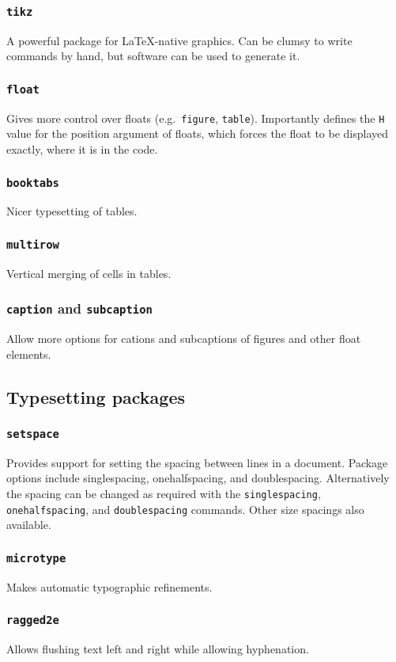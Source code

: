 \documentclass{article}
\begin{document}
\subsubsection{\texttt{tikz}}
A powerful package for \LaTeX-native graphics. Can be clumsy to write commands by hand, but software can be used to generate it.
\subsubsection{\texttt{float}}
Gives more control over floats (e.g.\ \texttt{figure}, \texttt{table}). Importantly defines the \texttt{H} value for the position argument of floats, which forces the float to be displayed exactly, where it is in the code.
\subsubsection{\texttt{booktabs}}
Nicer typesetting of tables.
\subsubsection{\texttt{multirow}}
Vertical merging of cells in tables.
\subsubsection{\texttt{caption} and \texttt{subcaption}}
Allow more options for cations and subcaptions of figures and other float elements.

\subsection{Typesetting packages}
\subsubsection{\texttt{setspace}}
Provides support for setting the spacing between lines in a document. Package options include singlespacing, onehalfspacing, and doublespacing. Alternatively the spacing can be changed as required with the \texttt{singlespacing}, \texttt{onehalfspacing}, and \texttt{doublespacing} commands. Other size spacings also available.
\subsubsection{\texttt{microtype}}
Makes automatic typographic refinements.
\subsubsection{\texttt{ragged2e}}
Allows flushing text left and right while allowing hyphenation.
\end{document}
